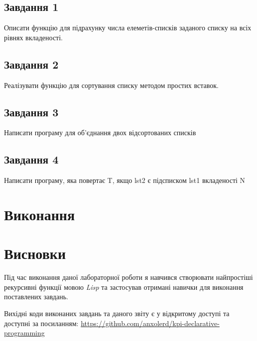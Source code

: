 \documentclass[a4paper, 12pt]{extarticle}
\begin{document}
\subsection{Завдання 1}
Описати функцію для підрахунку числа елеметів-списків заданого списку на всіх рівнях вкладеності.

\subsection{Завдання 2}
Реалізувати функцію для сортування списку методом простих вставок.

\subsection{Завдання 3}
Написати програму для об'єднання двох відсортованих списків

\subsection{Завдання 4}
Написати програму, яка повертає T, якщо lst2 є підсписком lst1 вкладеності N

\section{Виконання}





\section{Висновки}

Під час виконання даної лабораторної роботи я навчився створювати найпростіші рекурсивні функції мовою \textit{Lisp} та застосував отримані навички для виконання поставлених завдань.

Вихідні коди виконаних завдань та даного звіту є у відкритому доступі та доступні за посиланням: \url{https://github.com/anxolerd/kpi-declarative-programming}
\end{document}
